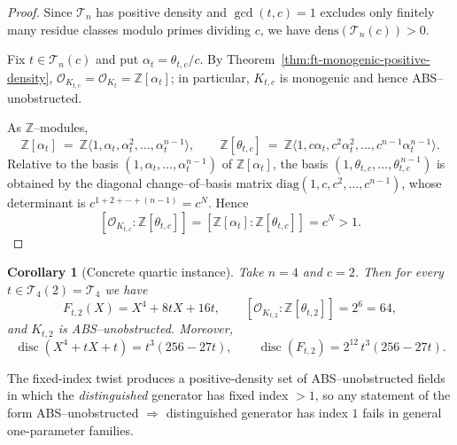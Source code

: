 \documentclass[11pt,letterpaper]{amsart}
\newcommand{\Z}{\mathbb{Z}}
\newcommand{\Ocal}{\mathcal{O}}
\newcommand{\disc}{\operatorname{disc}}
\theoremstyle{plain}
\newtheorem{corollary}[theorem]{Corollary}
\theoremstyle{definition}
\theoremstyle{remark}
\theoremstyle{plain}
\begin{document}
\begin{proof}
Since $\mathcal T_n$ has positive density and $\gcd(t,c)=1$ excludes only finitely many residue classes modulo primes dividing $c$,
we have $\mathrm{dens}(\mathcal T_n(c))>0$.

Fix $t\in\mathcal T_n(c)$ and put $\alpha_t=\theta_{t,c}/c$.
By Theorem~\ref{thm:ft-monogenic-positive-density}, $\Ocal_{K_{t,c}}=\Ocal_{K_t}=\Z[\alpha_t]$; in particular,
$K_{t,c}$ is monogenic and hence \textsc{ABS}--unobstructed.

As $\Z$--modules,
\[
\Z[\alpha_t]\ =\ \Z\langle 1,\alpha_t,\alpha_t^2,\dots,\alpha_t^{n-1}\rangle,
\qquad
\Z[\theta_{t,c}]\ =\ \Z\langle 1,c\alpha_t,c^2\alpha_t^2,\dots,c^{n-1}\alpha_t^{n-1}\rangle.
\]
Relative to the basis $(1,\alpha_t,\dots,\alpha_t^{n-1})$ of $\Z[\alpha_t]$,
the basis $(1,\theta_{t,c},\dots,\theta_{t,c}^{\,n-1})$ is obtained by the diagonal change--of--basis matrix
$\mathrm{diag}(1,c,c^2,\dots,c^{n-1})$, whose determinant is $c^{1+2+\cdots+(n-1)}=c^{N}$.
Hence
\[
[\Ocal_{K_{t,c}}:\Z[\theta_{t,c}]]=[\Z[\alpha_t]:\Z[\theta_{t,c}]]=c^{N}>1.
\]
\end{proof}

\begin{corollary}[Concrete quartic instance]
\label{cor:quartic-fixed-index}
Take $n=4$ and $c=2$.  Then for every $t\in\mathcal T_4(2)=\mathcal T_4$ we have
\[
F_{t,2}(X)=X^4+8tX+16t,\qquad
[\Ocal_{K_{t,2}}:\Z[\theta_{t,2}]]=2^{6}=64,
\]
and $K_{t,2}$ is \textsc{ABS}--unobstructed.  Moreover,
\[
\disc(X^4+tX+t)=t^3(256-27t),\qquad \disc(F_{t,2})=2^{12}\,t^3(256-27t).
\]
\end{corollary}


The fixed-index twist produces a positive-density set of \textsc{ABS}--unobstructed fields in which the \emph{distinguished}
generator has fixed index $>1$, so any statement of the form
\textsc{ABS}--unobstructed $\Rightarrow$ distinguished generator has index $1$ fails in general one-parameter families.
\end{document}
